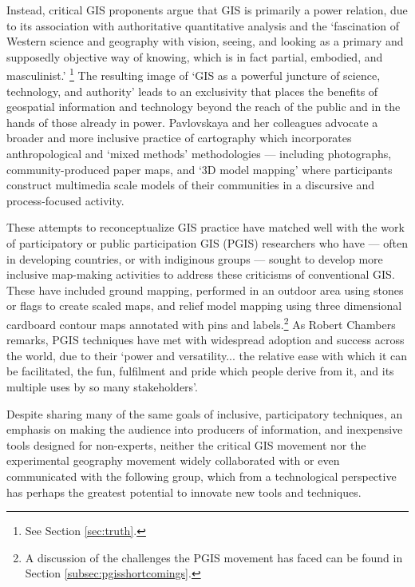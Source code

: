 \documentclass[11pt,oneside,notitlepage]{report}
\begin{document}
Instead, critical GIS proponents argue that GIS is primarily a power relation, due to its association with authoritative quantitative analysis and the `fascination of Western science and geography with vision, seeing, and looking as a primary and supposedly objective way of knowing, which is in fact partial, embodied, and masculinist.' \cite{pavlovskaya2009nonquantitative}\footnote{See Section \ref{sec:truth}.} The resulting image of `GIS as a powerful juncture of science, technology, and authority' \cite{pavlovskaya2009nonquantitative} leads to an exclusivity that places the benefits of geospatial information and technology beyond the reach of the public and in the hands of those already in power. Pavlovskaya and her colleagues advocate a broader and more inclusive practice of cartography which incorporates anthropological and `mixed methods' methodologies --- including photographs, community-produced paper maps, and `3D model mapping' where participants construct multimedia scale models of their communities in a discursive and process-focused activity. 

These attempts to reconceptualize GIS practice have matched well with the work of participatory or public participation GIS (PGIS) researchers who have --- often in developing countries, or with indiginous groups --- sought to develop more inclusive map-making activities to address these criticisms of conventional GIS. These have included ground mapping, performed in an outdoor area using stones or flags to create scaled maps, and relief model mapping using three dimensional cardboard contour maps annotated with pins and labels.\footnote{A discussion of the challenges the PGIS movement has faced can be found in Section \ref{subsec:pgisshortcomings}.} As Robert Chambers remarks, PGIS techniques have met with widespread adoption and success across the world, due to their `power and versatility... the relative ease with which it can be facilitated, the fun, fulfilment and pride which people derive from it, and its multiple uses by so many stakeholders'. \cite{chambers2006whose}

Despite sharing many of the same goals of inclusive, participatory techniques, an emphasis on making the audience into producers of information, and inexpensive tools designed for non-experts, neither the critical GIS movement nor the experimental geography movement widely collaborated with or even communicated with the following group, which from a technological perspective has perhaps the greatest potential to innovate new tools and techniques. 
\end{document}
